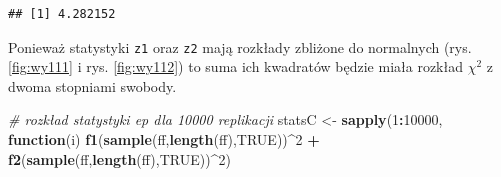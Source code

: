\documentclass[polish,]{book}
\newenvironment{Shaded}{\begin{snugshade}}{\end{snugshade}}
\newcommand{\CommentTok}[1]{\textcolor[rgb]{0.56,0.35,0.01}{\textit{#1}}}
\newcommand{\ControlFlowTok}[1]{\textcolor[rgb]{0.13,0.29,0.53}{\textbf{#1}}}
\newcommand{\DecValTok}[1]{\textcolor[rgb]{0.00,0.00,0.81}{#1}}
\newcommand{\KeywordTok}[1]{\textcolor[rgb]{0.13,0.29,0.53}{\textbf{#1}}}
\newcommand{\NormalTok}[1]{#1}
\newcommand{\OperatorTok}[1]{\textcolor[rgb]{0.81,0.36,0.00}{\textbf{#1}}}
\newcommand{\OtherTok}[1]{\textcolor[rgb]{0.56,0.35,0.01}{#1}}
\newcommand{\StringTok}[1]{\textcolor[rgb]{0.31,0.60,0.02}{#1}}
\begin{document}
\begin{verbatim}
## [1] 4.282152
\end{verbatim}

Ponieważ statystyki \texttt{z1} oraz \texttt{z2} mają rozkłady zbliżone do normalnych (rys. \ref{fig:wy111} i rys. \ref{fig:wy112}) to suma ich kwadratów będzie miała rozkład \(\chi^2\) z dwoma stopniami swobody.

\begin{Shaded}
\begin{Highlighting}[]
\CommentTok{# rozkład statystyki ep dla 10000 replikacji}
\NormalTok{statsC <-}\StringTok{ }\KeywordTok{sapply}\NormalTok{(}\DecValTok{1}\OperatorTok{:}\DecValTok{10000}\NormalTok{, }\ControlFlowTok{function}\NormalTok{(i) }\KeywordTok{f1}\NormalTok{(}\KeywordTok{sample}\NormalTok{(ff,}\KeywordTok{length}\NormalTok{(ff),}\OtherTok{TRUE}\NormalTok{))}\OperatorTok{^}\DecValTok{2} \OperatorTok{+}
\StringTok{                   }\KeywordTok{f2}\NormalTok{(}\KeywordTok{sample}\NormalTok{(ff,}\KeywordTok{length}\NormalTok{(ff),}\OtherTok{TRUE}\NormalTok{))}\OperatorTok{^}\DecValTok{2}\NormalTok{)}
\end{Highlighting}
\end{Shaded}
\end{document}
